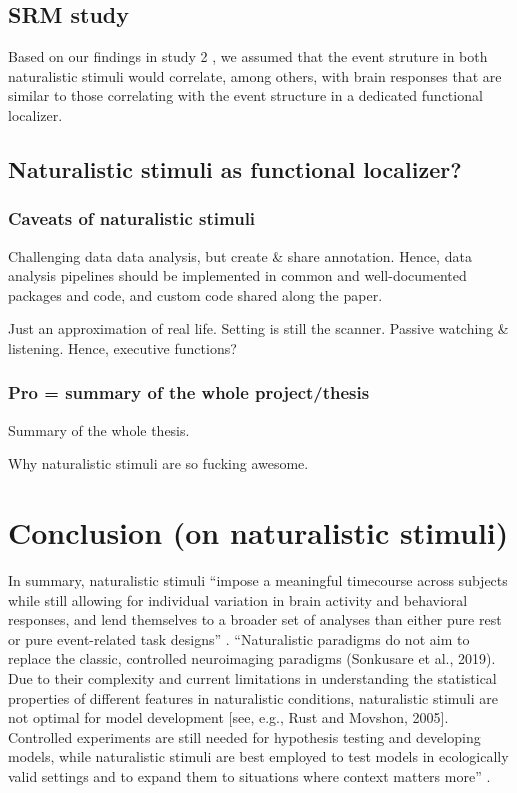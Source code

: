 \subsection{SRM study}

Based on our findings in study 2 \citep{haeusler2022processing}, we assumed that
the event struture in both naturalistic stimuli would correlate, among others,
with brain responses that are similar to those correlating with the event
structure in a dedicated functional localizer.



\subsection{Naturalistic stimuli as functional localizer?}


\subsubsection{Caveats of naturalistic stimuli}

%
Challenging data data analysis, but create \& share annotation.
%
Hence, data analysis pipelines should be implemented in common and
well-documented packages and code, and custom code shared along the paper.

%
Just an approximation of real life.
%
Setting is still the scanner.
%
Passive watching \& listening. Hence, executive functions?



\subsubsection{Pro = summary of the whole project/thesis}
%
Summary of the whole thesis.

%
Why naturalistic stimuli are so fucking awesome.


\section{Conclusion (on naturalistic stimuli)}
%
In summary, naturalistic stimuli ``impose a meaningful timecourse across
subjects while still allowing for individual variation in brain activity and
behavioral responses, and lend themselves to a broader set of analyses than
either pure rest or pure event-related task designs'' \citep{finn2017can}.
%
``Naturalistic paradigms do not aim to replace the classic, controlled
neuroimaging paradigms (Sonkusare et al., 2019). Due to their complexity and
current limitations in understanding the statistical properties of different
features in naturalistic conditions, naturalistic stimuli are not optimal for
model development [see, e.g., Rust and Movshon, 2005]. Controlled experiments
are still needed for hypothesis testing and developing models, while
naturalistic stimuli are best employed to test models in ecologically valid
settings and to expand them to situations where context matters
more'' \citep{saarimaki2021naturalistic}.
